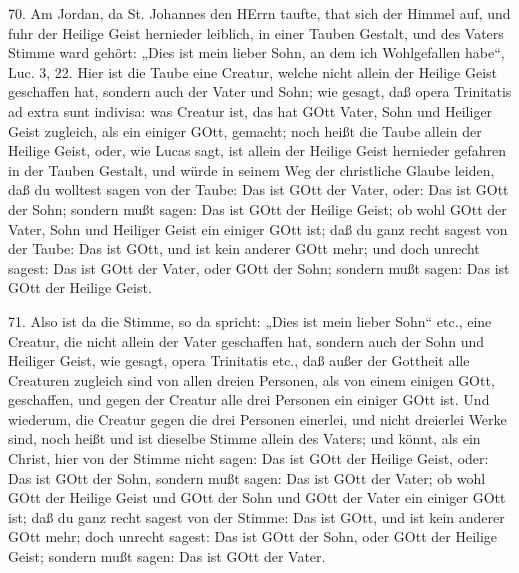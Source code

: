 70. Am Jordan, da St. Johannes den HErrn taufte, that sich der Himmel auf, und fuhr der Heilige Geist hernieder leiblich, in einer Tauben Gestalt, und des Vaters Stimme ward gehört: „Dies ist mein lieber Sohn, an dem ich Wohlgefallen habe“, Luc. 3, 22. Hier ist die Taube eine Creatur, welche nicht allein der Heilige Geist geschaffen hat, sondern auch der Vater und Sohn; wie gesagt, daß opera Trinitatis ad extra sunt indivisa: was Creatur ist, das hat GOtt Vater, Sohn und Heiliger Geist zugleich, als ein einiger GOtt, gemacht; noch heißt die Taube allein der Heilige Geist, oder, wie Lucas sagt, ist allein der Heilige Geist hernieder gefahren in der Tauben Gestalt, und würde in seinem Weg der christliche Glaube leiden, daß du wolltest sagen von der Taube: Das ist GOtt der Vater, oder: Das ist GOtt der Sohn; sondern mußt sagen: Das ist GOtt der Heilige Geist; ob wohl GOtt der Vater, Sohn und Heiliger Geist ein einiger GOtt ist; daß du ganz recht sagest von der Taube: Das ist GOtt, und ist kein anderer GOtt mehr; und doch unrecht sagest: Das ist GOtt der Vater, oder GOtt der Sohn; sondern mußt sagen: Das ist GOtt der Heilige Geist.

71. Also ist da die Stimme, so da spricht: „Dies ist mein lieber Sohn“ etc., eine Creatur, die nicht allein der Vater geschaffen hat, sondern auch der Sohn und Heiliger Geist, wie gesagt, opera Trinitatis etc., daß außer der Gottheit alle Creaturen zugleich sind von allen dreien Personen, als von einem einigen GOtt, geschaffen, und gegen der Creatur alle drei Personen ein einiger GOtt ist. Und wiederum, die Creatur gegen die drei Personen einerlei, und nicht dreierlei Werke sind, noch heißt und ist dieselbe Stimme allein des Vaters; und könnt, als ein Christ, hier von der Stimme nicht sagen: Das ist GOtt der Heilige Geist, oder: Das ist GOtt der Sohn, sondern mußt sagen: Das ist GOtt der Vater; ob wohl GOtt
der Heilige Geist und GOtt der Sohn und GOtt der Vater ein einiger GOtt ist; daß du ganz recht sagest von der Stimme: Das ist GOtt, und ist kein anderer GOtt mehr; doch unrecht sagest: Das ist GOtt der Sohn, oder GOtt der Heilige Geist; sondern mußt sagen: Das ist GOtt der Vater.

